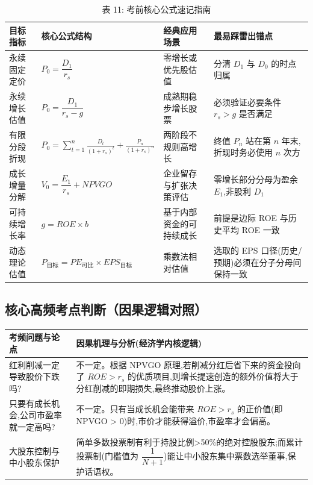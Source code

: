 \documentclass[lang=cn,10pt,color=blue]{elegantbook}
\begin{document}
\begin{table}[ht]
  \centering
  \caption{表 11: 考前核心公式速记指南}
  \renewcommand{\arraystretch}{1.4}
\begin{tabularx}{\textwidth}{llYY}
  \toprule
  目标指标 & 核心公式结构 & 经典应用场景 & 最易踩雷出错点 \\
  \midrule
  永续固定定价 & $P_0 = \dfrac{D_1}{r_s}$ & 零增长或优先股估值 & 分清 $D_1$ 与 $D_0$ 的时点归属 \\
  永续增长估值 & $P_0 = \dfrac{D_1}{r_s - g}$ & 成熟期稳步增长股票 & 必须验证必要条件 $r_s > g$ 是否满足 \\
  有限分段折现 & $P_0 = \displaystyle\sum_{t=1}^{n} \frac{D_t}{(1+r_s)^t} + \frac{P_n}{(1+r_s)^n}$ & 两阶段不规则高增长 & 终值 $P_n$ 站在第 $n$ 年末,折现时务必使用 $n$ 次方 \\
  成长增量分解 & $V_0 = \dfrac{E_1}{r_s} + NPVGO$ & 企业留存与扩张决策评估 & 零增长部分分母为盈余 $E_1$,非股利 $D_1$ \\
  可持续增长率 & $g = ROE \times b$ & 基于内部资金的可持续成长 & 前提是边际 ROE 与历史平均 ROE 一致 \\
  动态理论估值 & $P_{\text{目标}} = PE_{\text{可比}} \times EPS_{\text{目标}}$ & 乘数法相对估值 & 选取的 EPS 口径(历史/预期)必须在分子分母间保持一致 \\
  \bottomrule
\end{tabularx}
\end{table}

\subsection{核心高频考点判断（因果逻辑对照）}

\begin{table}[ht]
  \centering
  \renewcommand{\arraystretch}{1.4}
\begin{tabularx}{\textwidth}{lY}
  \toprule
  考频问题与论点 & 因果机理与分析(经济学内核逻辑) \\
  \midrule
  红利削减一定导致股价下跌吗? & 不一定。根据 NPVGO 原理,若削减分红后省下来的资金投向了 $ROE > r_s$ 的优质项目,则增长提速创造的额外价值将大于分红削减的即期损失,最终推动股价上涨。 \\
  只要有成长机会,公司市盈率就一定高吗? & 不一定。只有当成长机会能带来 $ROE > r_s$ 的正价值(即 NPVGO > 0)时,市价才能获得溢价,市盈率才会偏高。 \\
  大股东控制与中小股东保护 & 简单多数投票制有利于持股比例>50\%的绝对控股股东;而累计投票制(门槛值为 $\dfrac{1}{N+1}$)能让中小股东集中票数选举董事,保护话语权。 \\
  \bottomrule
\end{tabularx}
\end{table}
\end{document}
